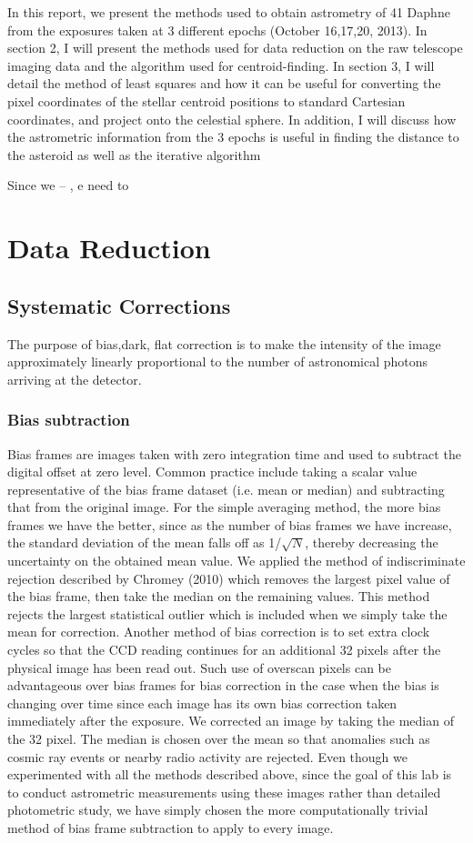 \documentclass[authoryear, 12pt,5p, times]{elsarticle}
\begin{document}
In this report, we present the methods used to obtain astrometry of 41 Daphne from the exposures taken at 3 different epochs (October 16,17,20, 2013). In section 2, I will present the methods used for data reduction on the raw telescope imaging data and the algorithm used for centroid-finding. In section 3, I will detail the method of least squares and how it can be useful for converting the pixel coordinates of the stellar centroid positions to standard Cartesian coordinates, and project onto the celestial sphere. In addition, I will discuss how the astrometric information from the 3 epochs is useful in finding the distance to the asteroid as well as the iterative algorithm
 

Since we -- , e need to 
\section{Data Reduction}
	\subsection{Systematic  Corrections}
The purpose of bias,dark, flat correction is to make the intensity of the image approximately linearly proportional to the number of astronomical photons arriving at the detector.
\subsubsection{Bias subtraction}
Bias frames are images taken with zero integration time and used to subtract the digital offset at zero level. Common practice include taking a scalar value representative of the bias frame dataset (i.e. mean or median) and subtracting that from the original image. For the simple averaging method, the more bias frames we have the better, since as the number of bias frames we have increase, the standard deviation of the mean falls off as 1/$\sqrt{N}$, thereby decreasing the uncertainty on the obtained mean value.  We applied the method of indiscriminate rejection described by Chromey (2010) which removes the largest pixel value of the bias frame, then take the median on the remaining values. This method rejects the largest statistical outlier which is included when we simply take the mean for correction. Another method of bias correction is to set extra clock cycles so that the CCD reading continues for an additional 32 pixels after the physical image has been read out. Such  use of overscan pixels can be advantageous over bias frames for bias correction in the case when the bias is changing over time since each image has its own bias correction taken immediately after the exposure. We corrected an image by taking the median of the 32 pixel. The median is chosen over the mean so that anomalies such as cosmic ray events or nearby radio activity are rejected. Even though we experimented with all the methods described above, since the goal of this lab is to conduct astrometric measurements using these images rather than detailed photometric study,  we have simply chosen the more computationally trivial method of bias frame subtraction to apply to every image. 			
\end{document}
